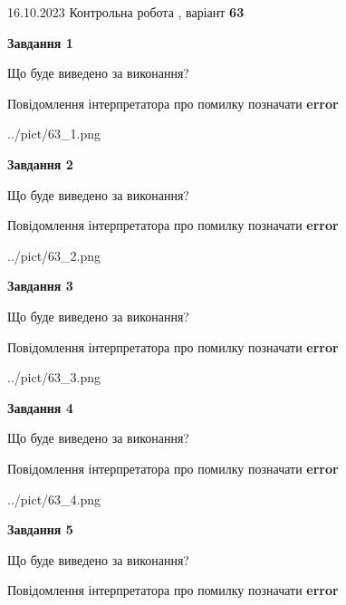 \documentclass[12pt, ukrainian]{article}
\begin{document}
{\Large{16.10.2023 Контрольна робота , варіант  \No \textbf { 63 }\par}}
{
\begin {large}
{\begin {center}\textbf{Завдання 1}\end {center}}\par
Що буде виведено за виконання? \par
Повідомлення інтерпретатора про помилку позначати \textbf{error}

\begin{center}
	{../pict/63_1.png}
\end{center}
\newpage

{\begin {center}\textbf{Завдання 2}\end {center}}\par
Що буде виведено за виконання? \par
Повідомлення інтерпретатора про помилку позначати \textbf{error}

\begin{center}
	{../pict/63_2.png}
\end{center}
\newpage

{\begin {center}\textbf{Завдання 3}\end {center}}\par
Що буде виведено за виконання? \par
Повідомлення інтерпретатора про помилку позначати \textbf{error}

\begin{center}
	{../pict/63_3.png}
\end{center}
\newpage

{\begin {center}\textbf{Завдання 4}\end {center}}\par
Що буде виведено за виконання? \par
Повідомлення інтерпретатора про помилку позначати \textbf{error}

\begin{center}
	{../pict/63_4.png}
\end{center}
\newpage

{\begin {center}\textbf{Завдання 5}\end {center}}\par
Що буде виведено за виконання? \par
Повідомлення інтерпретатора про помилку позначати \textbf{error}


\end{large}}
\end{document}
